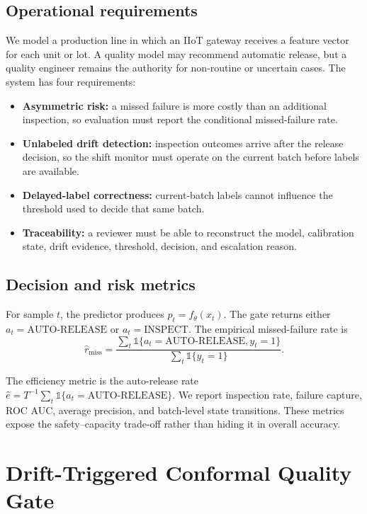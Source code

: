 \documentclass[journal]{IEEEtran}
\begin{document}
\subsection{Operational requirements}
We model a production line in which an IIoT gateway receives a feature vector for each unit or lot. A quality model may recommend automatic release, but a quality engineer remains the authority for non-routine or uncertain cases. The system has four requirements:
\begin{itemize}
    \item \textbf{Asymmetric risk:} a missed failure is more costly than an additional inspection, so evaluation must report the conditional missed-failure rate.
    \item \textbf{Unlabeled drift detection:} inspection outcomes arrive after the release decision, so the shift monitor must operate on the current batch before labels are available.
    \item \textbf{Delayed-label correctness:} current-batch labels cannot influence the threshold used to decide that same batch.
    \item \textbf{Traceability:} a reviewer must be able to reconstruct the model, calibration state, drift evidence, threshold, decision, and escalation reason.
\end{itemize}

\subsection{Decision and risk metrics}
For sample $t$, the predictor produces $p_t=f_{\theta}(x_t)$. The gate returns either $a_t=\mathrm{AUTO\text{-}RELEASE}$ or $a_t=\mathrm{INSPECT}$. The empirical missed-failure rate is
\begin{equation}
\widehat{r}_{\mathrm{miss}}=\frac{\sum_t \mathbb{1}\{a_t=\mathrm{AUTO\text{-}RELEASE},y_t=1\}}{\sum_t \mathbb{1}\{y_t=1\}}.
\label{eq:miss}
\end{equation}
{\raggedright The efficiency metric is the auto-release rate $\widehat{e}=T^{-1}\sum_t\mathbb{1}\{a_t=\mathrm{AUTO\text{-}RELEASE}\}$. We report inspection rate, failure capture, ROC AUC, average precision, and batch-level state transitions. These metrics expose the safety--capacity trade-off rather than hiding it in overall accuracy.\par}

\section{Drift-Triggered Conformal Quality Gate}
\label{sec:method}
\end{document}
